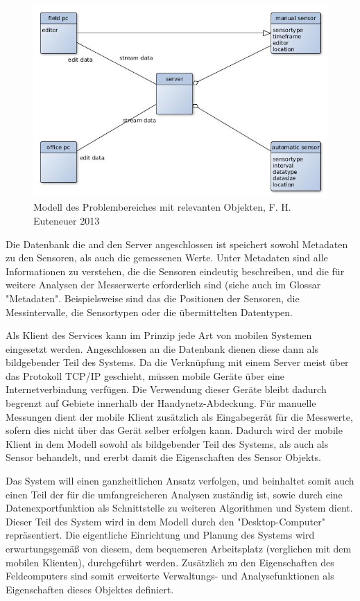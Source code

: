 \begin{figure}[H]
	\centering
 	 \includegraphics[scale=0.6]{graphics/model_of_issue.jpg} 
	\caption{Modell des Problembereiches mit relevanten Objekten, F. H. Euteneuer 2013}
	 \label{fig:model_domain}
\end{figure}

Die Datenbank die and den Server angeschlossen ist speichert sowohl Metadaten zu den Sensoren, als auch die gemessenen Werte. Unter Metadaten sind alle Informationen zu verstehen, die die Sensoren eindeutig beschreiben, und die für weitere Analysen der Messerwerte erforderlich sind (siehe auch im Glossar "Metadaten". Beispielsweise sind das die Positionen der Sensoren, die Messintervalle, die Sensortypen oder die übermittelten Datentypen.

Als Klient des Services kann im Prinzip jede Art von mobilen Systemen eingesetzt werden. Angeschlossen an die Datenbank dienen diese dann als bildgebender Teil des Systems. Da die Verknüpfung mit einem Server meist über das Protokoll  \gls{TCP/IP} geschieht, müssen mobile Geräte über eine Internetverbindung verfügen. Die Verwendung dieser Geräte bleibt dadurch begrenzt auf Gebiete innerhalb der Handynetz-Abdeckung. Für manuelle Messungen dient der mobile Klient zusätzlich als Eingabegerät für die Messwerte, sofern dies nicht über das Gerät selber erfolgen kann. Dadurch wird der mobile Klient in dem Modell sowohl als bildgebender Teil des Systems, als auch als Sensor behandelt, und ererbt damit die Eigenschaften des Sensor Objekts.

Das System will einen ganzheitlichen Ansatz verfolgen, und beinhaltet somit auch einen Teil der für die umfangreicheren Analysen zuständig ist, sowie durch eine Datenexportfunktion als Schnittstelle zu weiteren Algorithmen und System dient. Dieser Teil des System wird in dem Modell durch den "Desktop-Computer" repräsentiert. Die eigentliche Einrichtung und Planung des Systems wird erwartungsgemäß von diesem, dem bequemeren Arbeitsplatz (verglichen mit dem mobilen Klienten), durchgeführt werden. Zusätzlich zu den Eigenschaften des Feldcomputers sind somit erweiterte Verwaltungs- und Analysefunktionen als Eigenschaften dieses Objektes definiert.


